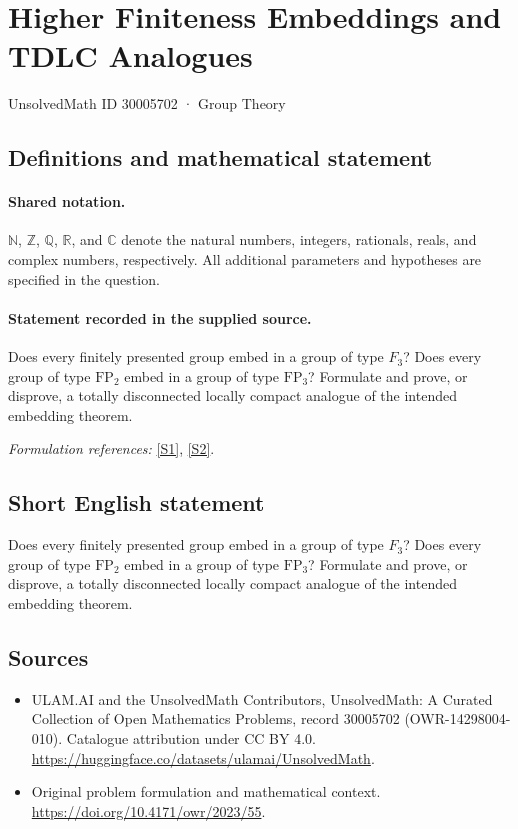 \documentclass[11pt]{article}
\newcommand{\sref}[2]{\hyperlink{source:#1:#2}{[S#2]}}
\begin{document}
\setcounter{section}{30005701}
\section{Higher Finiteness Embeddings and TDLC Analogues}\label{30005702}
{\small UnsolvedMath ID 30005702 · Group Theory}
\subsection{Definitions and mathematical statement}

\paragraph{Shared notation.}$\mathbb N$, $\mathbb Z$, $\mathbb Q$, $\mathbb R$, and $\mathbb C$ denote the natural numbers, integers, rationals, reals, and complex numbers, respectively. All additional parameters and hypotheses are specified in the question.


\paragraph{Statement recorded in the supplied source.}
Does every finitely presented group embed in a group of type $F_3$? Does every group of type $\mathrm{FP}_2$ embed in a group of type $\mathrm{FP}_3$? Formulate and prove, or disprove, a totally disconnected locally compact analogue of the intended embedding theorem.
\par\smallskip\textit{Formulation references:} \sref{30005702}{1}, \sref{30005702}{2}.
\subsection{Short English statement}
Does every finitely presented group embed in a group of type $F_3$? Does every group of type $\mathrm{FP}_2$ embed in a group of type $\mathrm{FP}_3$? Formulate and prove, or disprove, a totally disconnected locally compact analogue of the intended embedding theorem.
\subsection{Sources}
\begin{itemize}
\item[\hypertarget{source:30005702:1}{S1}] ULAM.AI and the UnsolvedMath Contributors, UnsolvedMath: A Curated Collection of Open Mathematics Problems, record 30005702 (OWR-14298004-010). Catalogue attribution under CC BY 4.0.
\url{https://huggingface.co/datasets/ulamai/UnsolvedMath}.
\item[\hypertarget{source:30005702:2}{S2}] Original problem formulation and mathematical context.
\url{https://doi.org/10.4171/owr/2023/55}.
\end{itemize}
\label{end:30005702}
\end{document}
